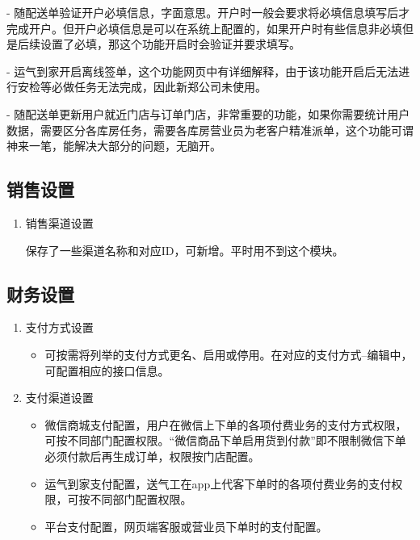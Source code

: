 \documentclass[UTF8]{ctexart}
\begin{document}
\begin{enumerate}
- 随配送单验证开户必填信息，字面意思。开户时一般会要求将必填信息填写后才完成开户。但开户必填信息是可以在系统上配置的，如果开户时有些信息非必填但是后续设置了必填，那这个功能开启时会验证并要求填写。

- 运气到家开启离线签单，这个功能网页中有详细解释，由于该功能开启后无法进行安检等必做任务无法完成，因此新郑公司未使用。

- 随配送单更新用户就近门店与订单门店，非常重要的功能，如果你需要统计用户数据，需要区分各库房任务，需要各库房营业员为老客户精准派单，这个功能可谓神来一笔，能解决大部分的问题，无脑开。

\end{enumerate}


\subsection{销售设置}
\begin{enumerate}
	\item 销售渠道设置
	
	保存了一些渠道名称和对应ID，可新增。平时用不到这个模块。
\end{enumerate}


\subsection{财务设置}
\begin{enumerate}
	\item 支付方式设置
	
	\begin{itemize}
		 
	\item 可按需将列举的支付方式更名、启用或停用。在对应的支付方式--编辑中，可配置相应的接口信息。

	\end{itemize}

	\item 支付渠道设置
	\begin{itemize}
		
		\item 微信商城支付配置，用户在微信上下单的各项付费业务的支付方式权限，可按不同部门配置权限。“微信商品下单启用货到付款”即不限制微信下单必须付款后再生成订单，权限按门店配置。
		
		\item 运气到家支付配置，送气工在app上代客下单时的各项付费业务的支付权限，可按不同部门配置权限。
		
		\item 平台支付配置，网页端客服或营业员下单时的支付配置。
		
	\end{itemize}



\end{enumerate}
\end{document}
